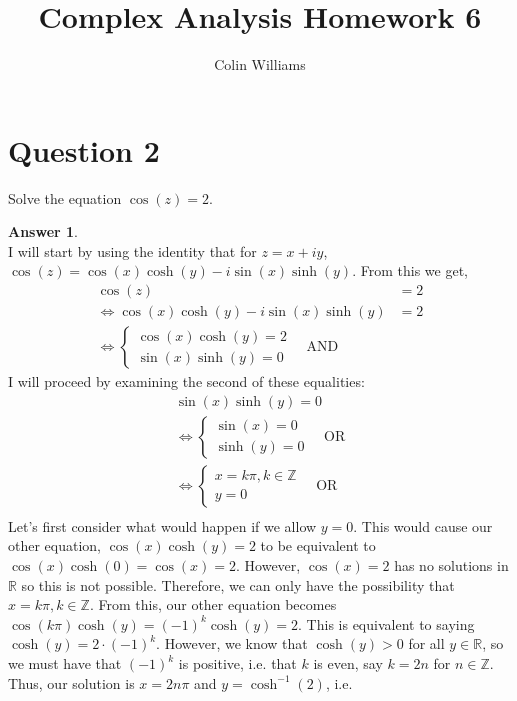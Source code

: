 \documentclass[10pt,a4paper]{article}
\title{Complex Analysis Homework 6}
\author{Colin Williams}
\theoremstyle{definition}
\newtheorem*{answer*}{Answer}
\begin{document}
\maketitle

\section*{Question 2}
Solve the equation $\cos(z) = 2$.

\begin{answer*}{$ $}
\\I will start by using the identity that for $z = x + iy$, $\cos(z) = \cos(x)\cosh(y) - i\sin(x)\sinh(y)$. From this we get,
\begin{align*}
\cos(z) &= 2\\
\iff \cos(x)\cosh(y) - i\sin(x)\sinh(y) &= 2\\
\iff
\begin{cases}
    \cos(x)\cosh(y) = 2\\
    \sin(x)\sinh(y) = 0
\end{cases} \quad \text{AND}
\end{align*}
I will proceed by examining the second of these equalities:
\begin{align*}
\sin(x)\sinh(y) = 0\\
\iff
\begin{cases}
	\sin(x) = 0\\
	\sinh(y) = 0
\end{cases} \quad \text{OR}\\
\iff
\begin{cases}
	x = k\pi, k \in \mathbb{Z}\\
	y = 0 
\end{cases} \quad \text{OR}\\
\end{align*}
Let's first consider what would happen if we allow $y = 0$. This would cause our other equation, $\cos(x)\cosh(y) = 2$ to be equivalent to $\cos(x)\cosh(0) = \cos(x) = 2$. However, $\cos(x) = 2$ has no solutions in $\mathbb{R}$ so this is not possible. Therefore, we can only have the possibility that $x = k\pi, k \in \mathbb{Z}$. From this, our other equation becomes $\cos(k\pi)\cosh(y) = (-1)^k\cosh(y) = 2$. This is equivalent to saying $\cosh(y) = 2\cdot (-1)^k$. However, we know that $\cosh(y) > 0$ for all $y \in \mathbb{R}$, so we must have that $(-1)^k$ is positive, i.e. that $k$ is even, say $k = 2n$ for $n \in \mathbb{Z}$. Thus, our solution is $x = 2n\pi$ and $y = \cosh^{-1}(2)$, i.e. 
\end{answer*}
\end{document}
